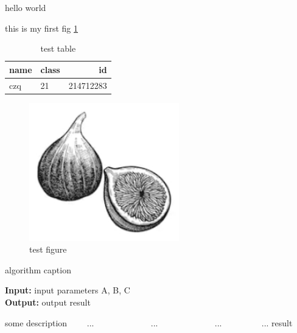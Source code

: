 \documentclass[journal]{IEEEtran}
\begin{document}
hello world

this is my first fig \ref{test-figure}

\cite{CZQ-cite1}

\begin{table}
\centering
\caption{test table}
\begin{tabular}{|p{5.1em}|p{5.1em}|r|}
\hline
name & class & id \\
\hline
czq & 21 & 214712283 \\
\hline
\end{tabular}
\end{table}

\begin{figure}
\centering
\includegraphics[width=6.5cm]{fig1.png}

\caption{test figure}
\label{test-figure}
\end{figure}

\begin{algorithm}[t]
\caption{algorithm caption} %
\hspace*{0.02in} {\bf Input:} %
input parameters A, B, C\\
\hspace*{0.02in} {\bf Output:} %
output result
\begin{algorithmic}[1]
\State some description %
　　\State ...
　　　　\State ...
　　\Else
　　　　\State ...
　　\EndIf
\EndFor
{} %
　　\State ...
\EndWhile
\State \Return result
\end{algorithmic}
\end{algorithm}





\nocite{CZQ-cite1}
\nocite{CZQ-cite2}
\end{document}
